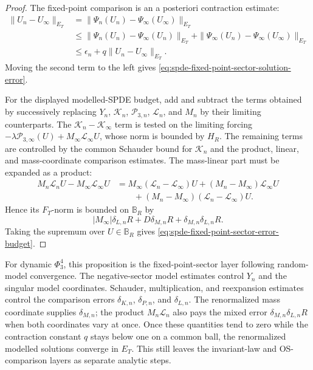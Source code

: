 \begin{proof}
The fixed-point comparison is an a posteriori contraction estimate:
\[
\begin{aligned}
  \|U_n-U_\infty\|_{E_T}
  &=
  \|\Psi_n(U_n)-\Psi_\infty(U_\infty)\|_{E_T} \\
  &\le
  \|\Psi_n(U_n)-\Psi_\infty(U_n)\|_{E_T}
  +
  \|\Psi_\infty(U_n)-\Psi_\infty(U_\infty)\|_{E_T}\\
  &\le
  \epsilon_n+q\|U_n-U_\infty\|_{E_T}.
\end{aligned}
\]
Moving the second term to the left gives
\eqref{eq:spde-fixed-point-sector-solution-error}.

For the displayed modelled-SPDE budget, add and subtract the terms obtained by
successively replacing \(Y_n\), \(\mathcal K_n\), \(\mathcal P_{3,n}\),
\(\mathcal L_n\), and \(M_n\) by their limiting counterparts.  The
\(\mathcal K_n-\mathcal K_\infty\) term is tested on the limiting forcing
\(-\lambda\mathcal P_{3,\infty}(U)+M_\infty\mathcal L_\infty U\), whose norm is
bounded by \(H_R\).  The remaining terms are controlled by the common Schauder
bound for \(\mathcal K_n\) and the product, linear, and mass-coordinate
comparison estimates.  The mass-linear part must be expanded as a product:
\[
\begin{aligned}
  M_n\mathcal L_nU-M_\infty\mathcal L_\infty U
  &=
  M_\infty(\mathcal L_n-\mathcal L_\infty)U
  +(M_n-M_\infty)\mathcal L_\infty U \\
  &\qquad
  +(M_n-M_\infty)(\mathcal L_n-\mathcal L_\infty)U .
\end{aligned}
\]
Hence its \(F_T\)-norm is bounded on \(\mathbb B_R\) by
\[
  |M_\infty|\delta_{L,n}R+D\delta_{M,n}R
  +\delta_{M,n}\delta_{L,n}R .
\]
Taking the supremum over \(U\in\mathbb B_R\) gives
\eqref{eq:spde-fixed-point-sector-error-budget}.
\end{proof}

For dynamic \(\Phi^4_3\), this proposition is the fixed-point-sector layer
following random-model convergence.  The negative-sector model estimates
control \(Y_n\) and the singular model coordinates.  Schauder, multiplication,
and reexpansion estimates control the comparison errors
\(\delta_{K,n}\), \(\delta_{P,n}\), and \(\delta_{L,n}\).  The renormalized mass
coordinate supplies \(\delta_{M,n}\); the product \(M_n\mathcal L_n\) also pays
the mixed error \(\delta_{M,n}\delta_{L,n}R\) when both coordinates vary at
once.  Once these quantities tend to zero while the contraction constant \(q\)
stays below one on a common ball, the
renormalized modelled solutions converge in \(E_T\).  This still leaves the
invariant-law and OS-comparison layers as separate analytic steps.

